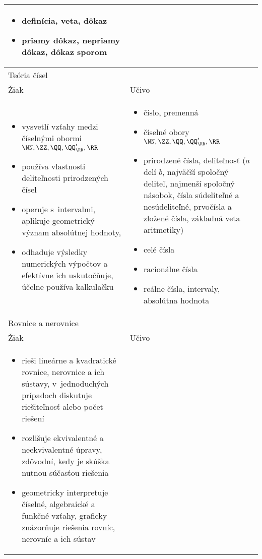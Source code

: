 \begin{longtable}{ p{} p{}}
\begin{itemize}
    \item definícia, veta, dôkaz
    \item priamy dôkaz, nepriamy dôkaz, dôkaz sporom
  \end{itemize} \\ \midrule
\multicolumn{2}{p{\textwidth}}{Teória čísel} \\ \midrule
  Žiak & Učivo\\ \vspace{-10pt}
  \begin{itemize}
    \item vysvetlí vzťahy medzi číselnými obormi $\NN, \ZZ, \QQ, \QQ'_{\RR}, \RR$
    \item používa vlastnosti deliteľnosti prirodzených čísel
    \item operuje s~intervalmi, aplikuje geometrický význam absolútnej hodnoty,
    \item odhaduje výsledky numerických výpočtov a efektívne ich uskutočňuje, účelne používa kalkulačku
  \end{itemize} & \vspace{-10pt}
  \begin{itemize}
    \item číslo, premenná
    \item číselné obory $\NN, \ZZ, \QQ, \QQ'_{\RR}, \RR$
    \item prirodzené čísla, deliteľnosť ($a$ delí $b$, najväčší spoločný deliteľ, najmenší spoločný násobok, čísla súdeliteľné a nesúdeliteľné, prvočísla a zložené čísla, základná veta aritmetiky)
    \item celé čísla
    \item racionálne čísla
    \item reálne čísla, intervaly, absolútna hodnota
  \end{itemize}\\ \midrule
\multicolumn{2}{p{\textwidth}}{Rovnice a nerovnice} \\ \midrule
  Žiak & Učivo \\ \vspace{-10pt}
  \begin{itemize}
    \item rieši lineárne a kvadratické rovnice, nerovnice a ich sústavy, v~jednoduchých prípadoch diskutuje riešiteľnosť alebo počet riešení
    \item rozlišuje ekvivalentné a neekvivalentné úpravy, zdôvodní, kedy je skúška nutnou súčasťou riešenia
    \item geometricky interpretuje číselné, algebraické a funkčné vzťahy, graficky znázorňuje riešenia rovníc, nerovníc a ich sústav

\end{itemize}
\end{longtable}
